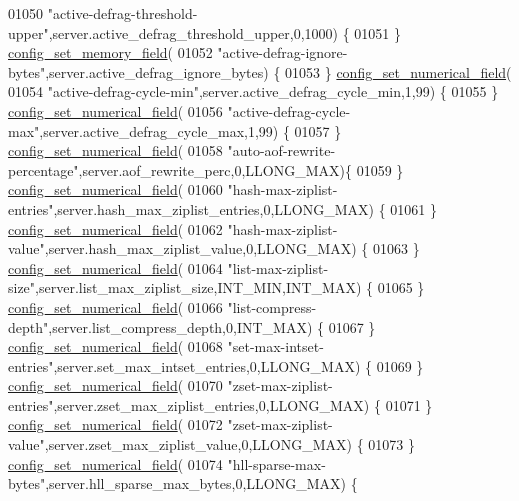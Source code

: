 \begin{DoxyCode}
{{{{{{{{01050       \textcolor{stringliteral}{"active-defrag-threshold-upper"},server.active\_defrag\_threshold\_upper,0,1000) \{
01051     \} \hyperlink{config_8c_ae9b891f5f43617ea158d55f449285b7d}{config\_set\_memory\_field}(
01052       \textcolor{stringliteral}{"active-defrag-ignore-bytes"},server.active\_defrag\_ignore\_bytes) \{
01053     \} \hyperlink{config_8c_aba8f21b37a3e47952951cf4bd15ad296}{config\_set\_numerical\_field}(
01054       \textcolor{stringliteral}{"active-defrag-cycle-min"},server.active\_defrag\_cycle\_min,1,99) \{
01055     \} \hyperlink{config_8c_aba8f21b37a3e47952951cf4bd15ad296}{config\_set\_numerical\_field}(
01056       \textcolor{stringliteral}{"active-defrag-cycle-max"},server.active\_defrag\_cycle\_max,1,99) \{
01057     \} \hyperlink{config_8c_aba8f21b37a3e47952951cf4bd15ad296}{config\_set\_numerical\_field}(
01058       \textcolor{stringliteral}{"auto-aof-rewrite-percentage"},server.aof\_rewrite\_perc,0,LLONG\_MAX)\{
01059     \} \hyperlink{config_8c_aba8f21b37a3e47952951cf4bd15ad296}{config\_set\_numerical\_field}(
01060       \textcolor{stringliteral}{"hash-max-ziplist-entries"},server.hash\_max\_ziplist\_entries,0,LLONG\_MAX) \{
01061     \} \hyperlink{config_8c_aba8f21b37a3e47952951cf4bd15ad296}{config\_set\_numerical\_field}(
01062       \textcolor{stringliteral}{"hash-max-ziplist-value"},server.hash\_max\_ziplist\_value,0,LLONG\_MAX) \{
01063     \} \hyperlink{config_8c_aba8f21b37a3e47952951cf4bd15ad296}{config\_set\_numerical\_field}(
01064       \textcolor{stringliteral}{"list-max-ziplist-size"},server.list\_max\_ziplist\_size,INT\_MIN,INT\_MAX) \{
01065     \} \hyperlink{config_8c_aba8f21b37a3e47952951cf4bd15ad296}{config\_set\_numerical\_field}(
01066       \textcolor{stringliteral}{"list-compress-depth"},server.list\_compress\_depth,0,INT\_MAX) \{
01067     \} \hyperlink{config_8c_aba8f21b37a3e47952951cf4bd15ad296}{config\_set\_numerical\_field}(
01068       \textcolor{stringliteral}{"set-max-intset-entries"},server.set\_max\_intset\_entries,0,LLONG\_MAX) \{
01069     \} \hyperlink{config_8c_aba8f21b37a3e47952951cf4bd15ad296}{config\_set\_numerical\_field}(
01070       \textcolor{stringliteral}{"zset-max-ziplist-entries"},server.zset\_max\_ziplist\_entries,0,LLONG\_MAX) \{
01071     \} \hyperlink{config_8c_aba8f21b37a3e47952951cf4bd15ad296}{config\_set\_numerical\_field}(
01072       \textcolor{stringliteral}{"zset-max-ziplist-value"},server.zset\_max\_ziplist\_value,0,LLONG\_MAX) \{
01073     \} \hyperlink{config_8c_aba8f21b37a3e47952951cf4bd15ad296}{config\_set\_numerical\_field}(
01074       \textcolor{stringliteral}{"hll-sparse-max-bytes"},server.hll\_sparse\_max\_bytes,0,LLONG\_MAX) \{
}}}}}}}}
\end{DoxyCode}
